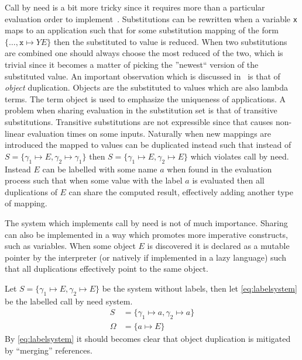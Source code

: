 \documentclass[11pt,oneside,a4paper]{report}
\begin{document}
Call by need is a bit more tricky since it requires more than a particular evaluation order to implement~\cite{levy1988sharing}.
Substitutions can be rewritten when a variable \texttt{x} maps to an application such that for some substitution mapping of the form $\{ \dots, \texttt{x} \mapsto Y E \}$ then the substituted to value is reduced.
When two substitutions are combined one should always choose the most reduced of the two, which is trivial since it becomes a matter of picking the ''newest`` version of the substituted value.
An important observation which is discussed in~\cite{levy1988sharing} is that of \textit{object} duplication.
Objects are the substituted to values which are also lambda terms.
The term object is used to emphasize the uniqueness of applications.
A problem when sharing evaluation in the substitution set is that of transitive substitutions.
Transitive substitutions are not expressible since that causes non-linear evaluation times on some inputs.
Naturally when new mappings are introduced the mapped to values can be duplicated instead such that instead of $S = \{ \gamma_1 \mapsto E, \gamma_2 \mapsto \gamma_1 \}$ then $S = \{ \gamma_1 \mapsto E, \gamma_2 \mapsto E \}$ which violates call by need.
Instead $E$ can be labelled with some name $a$ when found in the evaluation process such that when some value with the label $a$ is evaluated then all duplications of $E$ can share the computed result, effectively adding another type of mapping.
\begin{remark}
    The system which implements call by need is not of much importance.
    Sharing can also be implemented in a way which promotes more imperative constructs, such as variables.
    When some object $E$ is discovered it is declared as a mutable pointer by the interpreter (or natively if implemented in a lazy language) such that all duplications effectively point to the same object.
\end{remark}

Let $S = \{ \gamma_1 \mapsto E, \gamma_2 \mapsto E \}$ be the system without labels, then let \autoref{eq:labelsystem} be the labelled call by need system.
\begin{align}
    \label{eq:labelsystem}
    S &= \{ \gamma_1 \mapsto a, \gamma_2 \mapsto a \}\\
    \Omega &= \{ a \mapsto E \} \tag*{}
\end{align}
By \autoref{eq:labelsystem} it should becomes clear that object duplication is mitigated by ``merging'' references.
\end{document}
